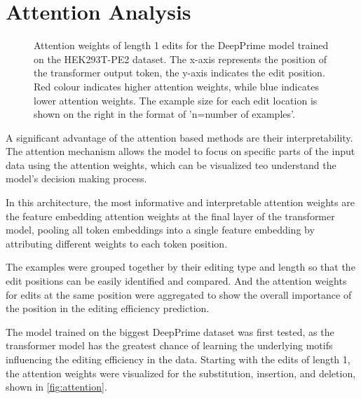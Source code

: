 \section{Attention Analysis}
\label{sec:attention_analysis}

\begin{figure}
    \centering
    \caption[Attention weights for the DeepPrime model trained on the HEK293T-PE2 dataset]{Attention weights of length 1 edits for the DeepPrime model trained on the HEK293T-PE2 dataset. The x-axis represents the position of the transformer output token, the y-axis indicates the edit position. Red colour indicates higher attention weights, while blue indicates lower attention weights. The example size for each edit location is shown on the right in the format of 'n=number of examples'.}
    \label{fig:attention}
\end{figure}

A significant advantage of the attention based methods are their interpretability. The attention mechanism allows the model to focus on specific parts of the input data using the attention weights, which can be visualized teo understand the model's decision making process. 

In this architecture, the most informative and interpretable attention weights are the feature embedding attention weights at the final layer of the transformer model, pooling all token embeddings into a single feature embedding by attributing different weights to each token position. 

The examples were grouped together by their editing type and length so that the edit positions can be easily identified and compared. And the attention weights for edits at the same position were aggregated to show the overall importance of the position in the editing efficiency prediction.

The model trained on the biggest DeepPrime dataset was first tested, as the transformer model has the greatest chance of learning the underlying motifs influencing the editing efficiency in the data. Starting with the edits of length 1, the attention weights were visualized for the substitution, insertion, and deletion, shown in \autoref{fig:attention}. 

